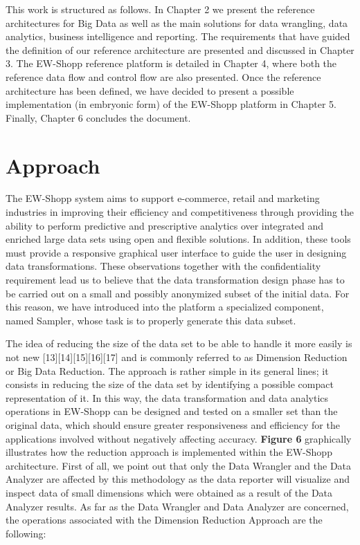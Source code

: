 This work is structured as follows. In Chapter 2 we present the reference architectures for Big Data as well as the main solutions for data wrangling, data analytics, business intelligence and reporting. The requirements that have guided the definition of our reference architecture are presented and discussed in Chapter 3. The EW-Shopp reference platform is detailed in Chapter 4, where both the reference data flow and control flow are also presented. Once the reference architecture has been defined, we have decided to present a possible implementation (in embryonic form) of the EW-Shopp platform in Chapter 5. Finally, Chapter 6 concludes the document. 


\section{Approach}
The EW-Shopp system aims to support e-commerce, retail and marketing industries in improving their efficiency and competitiveness through providing the ability to perform predictive and prescriptive analytics over integrated and enriched large data sets using open and flexible solutions. In addition, these tools must provide a responsive graphical user interface to guide the user in designing data transformations. These observations together with the confidentiality requirement lead us to believe that the data transformation design phase has to be carried out on a small and possibly anonymized subset of the initial data. For this reason, we have introduced into the platform a specialized component, named Sampler, whose task is to properly generate this data subset. 

The idea of reducing the size of the data set to be able to handle it more easily is not new \cite{XXX}[13][14][15][16][17]
and is commonly referred to as Dimension Reduction or Big Data Reduction. The approach is rather simple in its general lines; it consists in reducing the size of the data set by identifying a possible compact representation of it. In this way, the data transformation and data analytics operations in EW-Shopp can be designed and tested on a smaller set than the original data, which should ensure greater responsiveness and efficiency for the applications involved without negatively affecting accuracy.
\textbf{Figure 6} graphically illustrates how the reduction approach is implemented within the EW-Shopp architecture. First of all, we point out that only the Data Wrangler and the Data Analyzer are affected by this methodology as the data reporter will visualize and inspect data of small dimensions which were obtained as a result of the Data Analyzer results. 
As far as the Data Wrangler and Data Analyzer are concerned, the operations associated with the Dimension Reduction Approach are the following:

